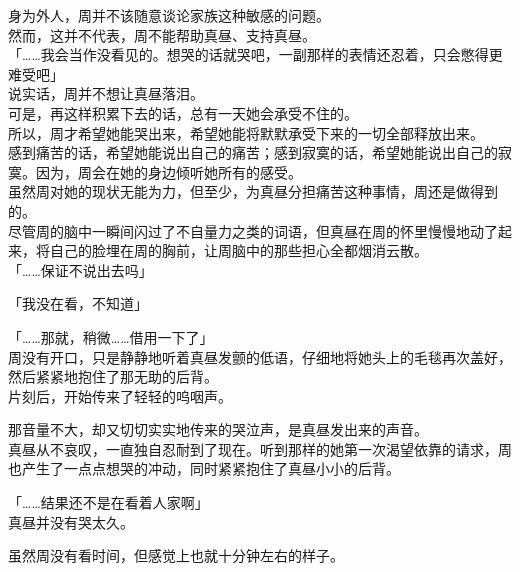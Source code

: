 身为外人，周并不该随意谈论家族这种敏感的问题。\\

然而，这并不代表，周不能帮助真昼、支持真昼。\\

「……我会当作没看见的。想哭的话就哭吧，一副那样的表情还忍着，只会憋得更难受吧」\\

说实话，周并不想让真昼落泪。\\

可是，再这样积累下去的话，总有一天她会承受不住的。\\

所以，周才希望她能哭出来，希望她能将默默承受下来的一切全部释放出来。\\

感到痛苦的话，希望她能说出自己的痛苦；感到寂寞的话，希望她能说出自己的寂寞。因为，周会在她的身边倾听她所有的感受。\\

虽然周对她的现状无能为力，但至少，为真昼分担痛苦这种事情，周还是做得到的。\\

尽管周的脑中一瞬间闪过了不自量力之类的词语，但真昼在周的怀里慢慢地动了起来，将自己的脸埋在周的胸前，让周脑中的那些担心全都烟消云散。\\

「……保证不说出去吗」

「我没在看，不知道」

「……那就，稍微……借用一下了」\\

周没有开口，只是静静地听着真昼发颤的低语，仔细地将她头上的毛毯再次盖好，然后紧紧地抱住了那无助的后背。\\

片刻后，开始传来了轻轻的呜咽声。

那音量不大，却又切切实实地传来的哭泣声，是真昼发出来的声音。\\

真昼从不哀叹，一直独自忍耐到了现在。听到那样的她第一次渴望依靠的请求，周也产生了一点点想哭的冲动，同时紧紧抱住了真昼小小的后背。\\

\vspace{2\baselineskip}

「……结果还不是在看着人家啊」\\

真昼并没有哭太久。

虽然周没有看时间，但感觉上也就十分钟左右的样子。\\

